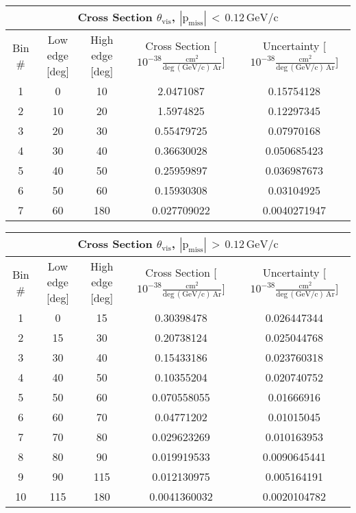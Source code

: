 \begin{table}[H]
\raggedright
\begin{adjustbox}{width=\textwidth}
\small
\begin{tabular}{ |c|c|c|c|c| }
\hline
\multicolumn{5}{|c|}{Cross Section $\theta_{\mathrm{vis}}$, $\mathrm{|p_{miss}|\,<\,0.12\,GeV/c}$} \\
\hline
\hline
Bin \# & Low edge [deg] & High edge [deg] & Cross Section [$10^{-38}\mathrm{\frac{cm^{2}}{deg\,(GeV/c)\,Ar}}$] & Uncertainty [$10^{-38}\mathrm{\frac{cm^{2}}{deg\,(GeV/c)\,Ar}}$] \\
\hline
\hline
1 & 0 & 10 & 2.0471087 & 0.15754128\\
2 & 10 & 20 & 1.5974825 & 0.12297345\\
3 & 20 & 30 & 0.55479725 & 0.07970168\\
4 & 30 & 40 & 0.36630028 & 0.050685423\\
5 & 40 & 50 & 0.25959897 & 0.036987673\\
6 & 50 & 60 & 0.15930308 & 0.03104925\\
7 & 60 & 180 & 0.027709022 & 0.0040271947\\
\hline
\end{tabular}
\end{adjustbox}
\end{table}


\begin{table}[H]
\raggedright
\begin{adjustbox}{width=\textwidth}
\small
\begin{tabular}{ |c|c|c|c|c| }
\hline
\multicolumn{5}{|c|}{Cross Section $\theta_{\mathrm{vis}}$, $\mathrm{|p_{miss}|\,>\,0.12\,GeV/c}$} \\
\hline
\hline
Bin \# & Low edge [deg] & High edge [deg] & Cross Section [$10^{-38}\mathrm{\frac{cm^{2}}{deg\,(GeV/c)\,Ar}}$] & Uncertainty [$10^{-38}\mathrm{\frac{cm^{2}}{deg\,(GeV/c)\,Ar}}$] \\
\hline
\hline
1 & 0 & 15 & 0.30398478 & 0.026447344\\
2 & 15 & 30 & 0.20738124 & 0.025044768\\
3 & 30 & 40 & 0.15433186 & 0.023760318\\
4 & 40 & 50 & 0.10355204 & 0.020740752\\
5 & 50 & 60 & 0.070558055 & 0.01666916\\
6 & 60 & 70 & 0.04771202 & 0.01015045\\
7 & 70 & 80 & 0.029623269 & 0.010163953\\
8 & 80 & 90 & 0.019919533 & 0.0090645441\\
9 & 90 & 115 & 0.012130975 & 0.005164191\\
10 & 115 & 180 & 0.0041360032 & 0.0020104782\\
\hline
\end{tabular}
\end{adjustbox}
\end{table}


